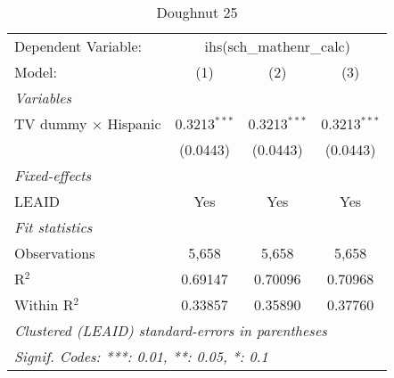 \begin{table}[htbp]
\centering
\caption{Doughnut 25}
\begin{tabular}{lccc}
\tabularnewline\midrule\midrule
Dependent Variable:&\multicolumn{3}{c}{ihs(sch\_mathenr\_calc)}\\
Model:&(1) & (2) & (3)\\
\midrule \emph{Variables}&   &   &  \\
TV dummy $\times$ Hispanic & 0.3213$^{***}$ & 0.3213$^{***}$ & 0.3213$^{***}$\\
  &(0.0443) & (0.0443) & (0.0443)\\
\midrule \emph{Fixed-effects}&   &   &  \\
LEAID & Yes & Yes & Yes\\
\midrule \emph{Fit statistics}&  & & \\
Observations & 5,658&5,658&5,658\\
R$^2$ & 0.69147&0.70096&0.70968\\
Within R$^2$ & 0.33857&0.35890&0.37760\\
\midrule\midrule\multicolumn{4}{l}{\emph{Clustered (LEAID) standard-errors in parentheses}}\\
\multicolumn{4}{l}{\emph{Signif. Codes: ***: 0.01, **: 0.05, *: 0.1}}\\
\end{tabular}
\end{table}

